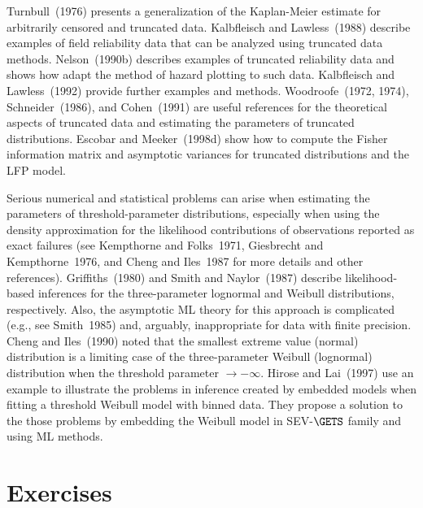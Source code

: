 Turnbull~(1976) presents a generalization of the Kaplan-Meier estimate
for arbitrarily censored and  
truncated data.  Kalbfleisch and Lawless~(1988) describe examples of
field reliability data that can be analyzed using truncated data
methods.  Nelson~(1990b) describes examples of truncated reliability
data and shows how adapt the method of hazard plotting to such data.
Kalbfleisch and Lawless~(1992) provide further examples and methods.
Woodroofe~(1972, 1974),
Schneider~(1986), and Cohen~(1991) are useful references for the
theoretical aspects of truncated data and estimating the parameters of
truncated distributions.  Escobar and Meeker~(1998d) show how to
compute the Fisher information matrix and asymptotic variances for
truncated distributions and the LFP model.


Serious numerical and statistical problems can arise when estimating
the parameters of threshold-parameter distributions, especially when
using the density approximation for the likelihood contributions of
observations reported as exact failures (see Kempthorne and
Folks~1971, Giesbrecht and Kempthorne~1976, and Cheng and Iles~1987
for more details and other references).  Griffiths~(1980) and Smith
and Naylor~(1987) describe likelihood-based inferences for the
three-parameter lognormal and Weibull distributions, respectively.
Also, the asymptotic ML theory for this approach is complicated (e.g.,
see Smith~1985) and, arguably, inappropriate for data with finite
precision.  Cheng and Iles~(1990) noted that the smallest extreme
value (normal) distribution is a limiting case of the three-parameter
Weibull (lognormal) distribution when the threshold parameter
$\rightarrow -\infty$.  Hirose and Lai~(1997) use an example to
illustrate the problems in inference created by embedded models when
fitting a threshold Weibull model with binned data. They propose a
solution to the those problems by embedding the Weibull model in
SEV-$\GETS$ family and using ML methods.

\section*{Exercises}


